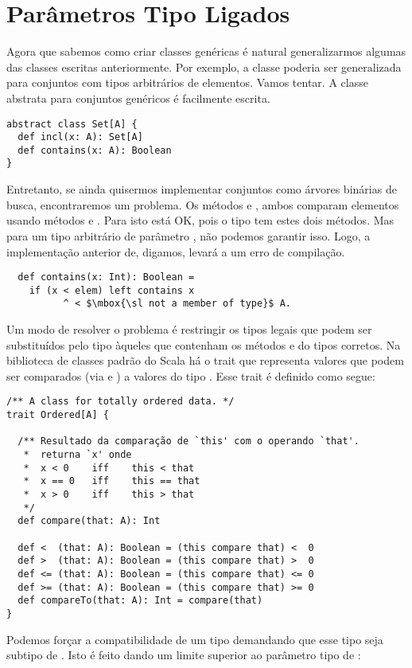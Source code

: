 \section{Parâmetros Tipo Ligados}

Agora que sabemos como criar classes genéricas é natural generalizarmos 
algumas das classes escritas anteriormente. Por exemplo, a classe 
poderia ser generalizada para conjuntos com tipos arbitrários de elementos.
Vamos tentar. A classe abstrata para conjuntos genéricos é facilmente escrita.

\begin{lstlisting}
abstract class Set[A] {
  def incl(x: A): Set[A]
  def contains(x: A): Boolean
}
\end{lstlisting}
Entretanto, se ainda quisermos implementar conjuntos como árvores binárias 
de busca, encontraremos um problema. Os métodos  e , 
ambos comparam elementos usando métodos \code{<} e \code{>}. Para 
isto está OK, pois o tipo  tem estes dois métodos. Mas para um 
tipo arbitrário de parâmetro , não podemos garantir isso. Logo, a 
implementação anterior de, digamos,  levará a um erro de compilação.

\begin{lstlisting}
  def contains(x: Int): Boolean =
    if (x < elem) left contains x
          ^ < $\mbox{\sl not a member of type}$ A.
\end{lstlisting}

Um modo de resolver o problema é restringir os tipos legais que podem ser
substituídos pelo tipo  àqueles que contenham os métodos \code{<} e 
\code{>} do tipos corretos. Na biblioteca de classes padrão do Scala há 
o trait  que representa valores que podem ser comparados (via \code{<}
e \code{>}) a valores do tipo . Esse trait é definido como segue:

\begin{lstlisting}
/** A class for totally ordered data. */
trait Ordered[A] {

  /** Resultado da comparação de `this' com o operando `that'.
   *  returna `x' onde
   *  x < 0    iff    this < that
   *  x == 0   iff    this == that
   *  x > 0    iff    this > that
   */
  def compare(that: A): Int

  def <  (that: A): Boolean = (this compare that) <  0
  def >  (that: A): Boolean = (this compare that) >  0
  def <= (that: A): Boolean = (this compare that) <= 0
  def >= (that: A): Boolean = (this compare that) >= 0
  def compareTo(that: A): Int = compare(that)
}
\end{lstlisting}
Podemos forçar a compatibilidade de um tipo demandando que esse tipo seja
subtipo de . Isto é feito dando um limite superior ao 
parâmetro tipo de :

